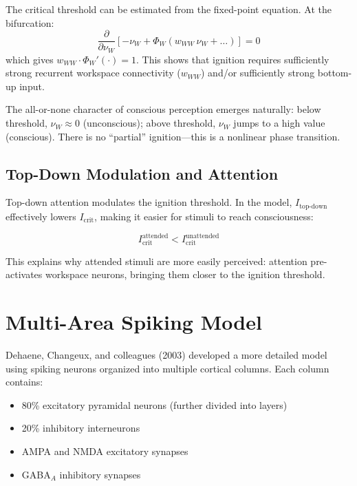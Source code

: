 \documentclass[11pt,a4paper]{report}
\begin{document}
\begin{mathbox}
\vspace{-6pt}
The critical threshold can be estimated from the fixed-point equation. At the bifurcation:
\[
  \frac{\partial}{\partial \nu_W} \left[-\nu_W + \Phi_W(w_{WW}\,\nu_W + \ldots)\right] = 0
\]
which gives $w_{WW} \cdot \Phi_W'(\cdot) = 1$. This shows that ignition requires sufficiently strong recurrent workspace connectivity ($w_{WW}$) and/or sufficiently strong bottom-up input.
\vspace{-4pt}
\end{mathbox}

The all-or-none character of conscious perception emerges naturally: below threshold, $\nu_W \approx 0$ (unconscious); above threshold, $\nu_W$ jumps to a high value (conscious). There is no ``partial'' ignition---this is a nonlinear phase transition.

\subsection{Top-Down Modulation and Attention}

Top-down attention modulates the ignition threshold. In the model, $I_{\text{top-down}}$ effectively lowers $I_{\text{crit}}$, making it easier for stimuli to reach consciousness:

\[
  I_{\text{crit}}^{\text{attended}} < I_{\text{crit}}^{\text{unattended}}
\]

This explains why attended stimuli are more easily perceived: attention pre-activates workspace neurons, bringing them closer to the ignition threshold.

\section{Multi-Area Spiking Model}

Dehaene, Changeux, and colleagues (2003) developed a more detailed model using spiking neurons organized into multiple cortical columns. Each column contains:

\begin{itemize}[leftmargin=1.5em]
  \item 80\% excitatory pyramidal neurons (further divided into layers)
  \item 20\% inhibitory interneurons
  \item AMPA and NMDA excitatory synapses
  \item GABA$_A$ inhibitory synapses
\end{itemize}
\end{document}
